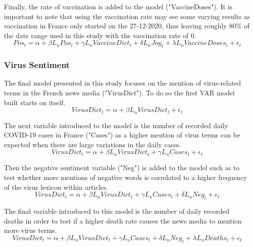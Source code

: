 Finally, the rate of vaccination is added to the model ("VaccineDoses"). It is important to note that using the vaccination rate may see some varying results as vaccination in France only started on the 27-12-2020, thus leaving roughly 80\% of the date range used in this study with the vaccination rate of 0.
\begin{equation}
    Pos_{t} = \alpha + \beta L_{n} Pos_{t} + \gamma L_{n} VaccineDict_{t} + \delta L_{n} Joy_{t} + \lambda L_{n} VaccineDoses_{t} + \epsilon_{t}
\end{equation}

\subsubsection{Virus Sentiment}

The final model presented in this study focuses on the mention of virus-related terms in the French news media ("VirusDict"). To do so the first VAR model built starts on itself.
\begin{equation}
    VirusDict_{t} = \alpha + \beta L_{n} VirusDict_{t} + \epsilon_{t}
\end{equation}

The next variable introduced to the model is the number of recorded daily COVID-19 cases in France ("Cases") as a higher mention of virus terms can be expected when there are large variations in the daily cases.
\begin{equation}
    VirusDict_{t} = \alpha + \beta L_{n} VirusDict_{t} + \gamma L_{n} Cases_{t} + \epsilon_{t}
\end{equation}

Then the negative sentiment variable ("Neg") is added to the model such as to test whether more mentions of negative words is correlated to a higher frequency of the virus lexicon within articles. 
\begin{equation}
    VirusDict_{t} = \alpha + \beta L_{n} VirusDict_{t} + \gamma L_{n} Cases_{t} + \delta L_{n} Neg_{t} + \epsilon_{t}
\end{equation}

The final variable introduced to this model is the number of daily recorded deaths in order to test if a higher death rate causes the news media to mention more virus terms.
\begin{equation}
    VirusDict_{t} = \alpha + \beta L_{n} VirusDict_{t} + \gamma L_{n} Cases_{t} + \delta L_{n} Neg_{t} + \lambda L_{n} Deaths_{t} + \epsilon_{t}
\end{equation}